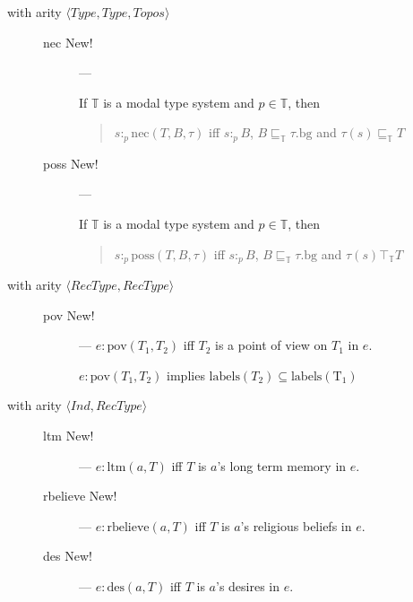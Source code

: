\begin{description}
\begin{description}
  \end{description}

\item[with arity
  \textnormal{$\langle\textit{Type},\textit{Type},\textit{Topos}\rangle$}]
  \mbox{}

  \begin{description}

    
  \item[\textnormal{nec} New!] ---

    If $\mathbb{T}$ is a modal type system and $p\in\mathbb{T}$, then
    \begin{quote}
      $s:_p\mathrm{nec}(T,B,\tau)$ iff $s:_pB$, 
      $B\sqsubseteq_{\mathbb{T}}\tau.\mathrm{bg}$ and 
      $\tau(s)\sqsubseteq_{\mathbb{T}}T$
    \end{quote}

    
  \item[\textnormal{poss} New!] ---

    If $\mathbb{T}$ is a modal type system and $p\in\mathbb{T}$, then
    \begin{quote}
      $s:_p\mathrm{poss}(T,B,\tau)$ iff $s:_pB$, 
      $B\sqsubseteq_{\mathbb{T}}\tau.\mathrm{bg}$ and 
      $\tau(s)\top_{\mathbb{T}}T$
    \end{quote}

  \end{description}

  
\item[with arity
  \textnormal{$\langle\textit{RecType},\textit{RecType}\rangle$}] \mbox{}

  \begin{description}
    
  \item[\textnormal{pov} New!] --- $e:\text{pov}(T_1,T_2)$ iff $T_2$
    is a point of view on $T_1$ in $e$.

    $e:\text{pov}(T_1,T_2)$ implies
    $\mathrm{labels}(T_2)\subseteq\mathrm{labels(T_1)}$

  \end{description}

  
\item[with arity
  \textnormal{$\langle\textit{Ind},\textit{RecType}\rangle$}] \mbox{}

  \begin{description}
    
  \item[\textnormal{ltm} New!] --- $e:\text{ltm}(a,T)$ iff $T$ is $a$'s
    long term memory in $e$.
    
  \item[\textnormal{rbelieve} New!] --- $e:\text{rbelieve}(a,T)$ iff
    $T$ is $a$'s religious beliefs in $e$.

    
  \item[\textnormal{des} New!] --- $e:\text{des}(a,T)$ iff $T$ is
    $a$'s desires in $e$.

  \end{description}
  
  

  
  
  


\end{description}

